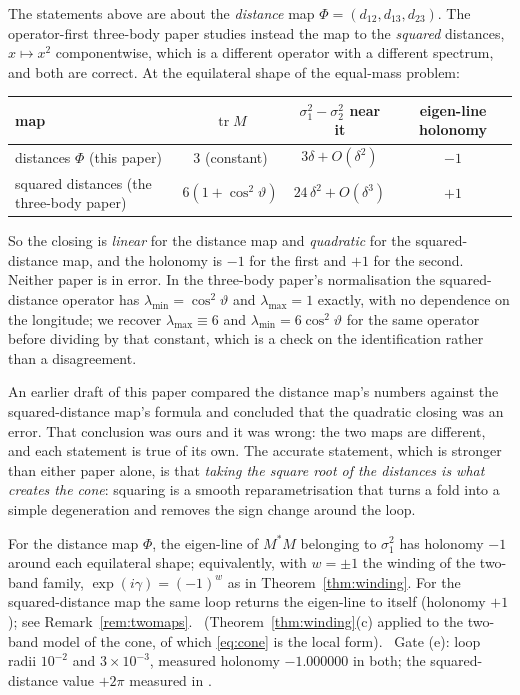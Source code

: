 \begin{remark}\label{rem:twomaps}
The statements above are about the \emph{distance} map $\Phi=(d_{12},d_{13},d_{23})$. The
operator-first three-body paper \Cc{} \cite{corpus3b} studies instead the map to the
\emph{squared} distances, $x\mapsto x^{2}$ componentwise, which is a different operator with a
different spectrum, and both are correct. At the equilateral shape of the equal-mass problem:
\begin{center}
\begin{tabular}{@{}lccc@{}}
\toprule
map & $\operatorname{tr}M$ & $\sigma_1^2-\sigma_2^2$ near it & eigen-line holonomy \\
\midrule
distances $\Phi$ (this paper) & $3$ (constant) & $3\delta+O(\delta^2)$ & $-1$ \\
squared distances (the three-body paper) & $6(1+\cos^2\vartheta)$ & $24\,\delta^2+O(\delta^3)$ & $+1$ \\
\bottomrule
\end{tabular}
\end{center}
So the closing is \emph{linear} for the distance map and \emph{quadratic} for the squared-distance
map, and the holonomy is $-1$ for the first and $+1$ for the second. Neither paper is in error.
In the three-body paper's normalisation the squared-distance operator has
$\lambda_{\min}=\cos^2\vartheta$ and $\lambda_{\max}=1$ exactly, with no dependence on the
longitude; we recover $\lambda_{\max}\equiv6$ and $\lambda_{\min}=6\cos^2\vartheta$ for the same
operator before dividing by that constant, which is a check on the identification rather than a
disagreement.

An earlier draft of this paper compared the distance map's numbers against the squared-distance
map's formula and concluded that the quadratic closing was an error. That conclusion was ours and
it was wrong: the two maps are different, and each statement is true of its own. The accurate
statement, which is stronger than either paper alone, is that \emph{taking the square root of the
distances is what creates the cone}: squaring is a smooth reparametrisation that turns a fold into
a simple degeneration and removes the sign change around the loop.
\end{remark}

\begin{theorem}\label{thm:shape-holonomy}
For the distance map $\Phi$, the eigen-line of $M^*M$ belonging to $\sigma_1^2$ has holonomy
$-1$ around each equilateral shape; equivalently, with $w=\pm1$ the winding of the two-band
family, $\exp(i\gamma)=(-1)^w$ as in Theorem~\ref{thm:winding}. For the squared-distance map the
same loop returns the eigen-line to itself (holonomy $+1$); see Remark~\ref{rem:twomaps}.
\T\ (Theorem~\ref{thm:winding}(c) applied to the two-band model of the cone, of which
\eqref{eq:cone} is the local form). \V\ Gate  (e): loop radii
$10^{-2}$ and $3\times10^{-3}$, measured holonomy $-1.000000$ in both; the squared-distance
value $+2\pi$ measured in .
\end{theorem}

